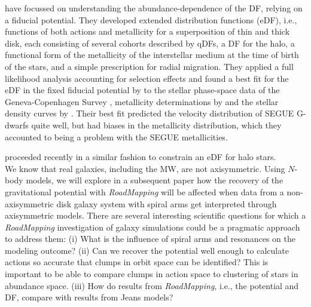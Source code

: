 \documentclass[iop,revtex4,numberedappendix,appendixfloats]{emulateapj}
\newcommand{\RM}{{\sl RoadMapping}}
\begin{document}
\citet{2015MNRAS.449.3479S} have focussed on understanding the abundance-dependence of the DF, relying on a fiducial potential. They developed extended distribution functions (eDF), i.e., functions of both actions and metallicity for a superposition of thin and thick disk, each consisting of several cohorts described by qDFs, a DF for the halo, a functional form of the metallicity of the interstellar medium at the time of birth of the stars, and a simple prescription for radial migration. They applied a full likelihood analysis accounting for selection effects and found a best fit for the eDF in the fixed fiducial potential by \citet{1998MNRAS.294..429D} to the stellar phase-space data of the Geneva-Copenhagen Survey \citep{2004A&A...418..989N,2009A&A...501..941H}, metallicity determinations by \citet{2011A&A...530A.138C} and the stellar density curves by \citet{1983MNRAS.202.1025G}. Their best fit predicted the velocity distribution of SEGUE G-dwarfs \citep{2014ApJS..211...17A} quite well, but had biases in the metallicity distribution, which they accounted to being a problem with the SEGUE metallicities. 

\citet{2016MNRAS.tmp..817D} proceeded recently in a similar fashion to constrain an eDF for halo stars.\\

 We know that real galaxies, including the MW, are not axisymmetric. Using $N$-body models, we will explore in a subsequent paper how the recovery of the gravitational potential with \RM{} will be affected when data from a non-axisymmetric disk galaxy system with spiral arms get interpreted through axisymmetric models. There are several interesting scientific questions for which a \RM{} investigation of galaxy simulations could be a pragmatic approach to address them: (i) What is the influence of spiral arms and resonances on the modeling outcome? (ii) Can we recover the potential well enough to calculate actions so accurate that clumps in orbit space can be identified? This is important to be able to compare clumps in action space to clustering of stars in abundance space. (iii) How do results from \RM{}, i.e., the potential and DF, compare with results from Jeans models?


\end{document}
